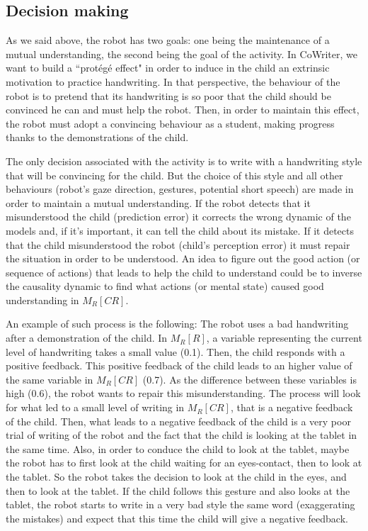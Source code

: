 \documentclass[10pt,a4paper]{article}
\begin{document}
\subsection{Decision making}
\label{ssec:decision}

As we said above, the robot has two goals: one being the maintenance of a mutual understanding, the second being the goal of the activity. 
In CoWriter, we want to build a ``prot\'eg\'e effect" in order to induce in the child an extrinsic motivation to practice handwriting. 
In that perspective, the behaviour of the robot is to pretend that its handwriting is so poor that the child should be convinced he can and must help the robot. Then, in order to maintain this effect, the robot must adopt a convincing behaviour as a student, making progress thanks to the demonstrations of the child. 

The only decision associated with the activity is to write with a handwriting style that will be convincing for the child. 
But the choice of this style and all other behaviours (robot's gaze direction, gestures, potential short speech) are made in order to maintain a mutual understanding. 
If the robot detects that it misunderstood the child (prediction error) it corrects the wrong dynamic of the models and, if it's important, it can tell the child about its mistake. 
If it detects that the child misunderstood the robot (child's perception error) it must repair the situation in order to be understood. 
An idea to figure out the good action (or sequence of actions) that leads to help the child to understand could be to inverse the causality dynamic to find what actions (or mental state) caused good understanding in $M_R\left[CR\right]$. 

An example of such process is the following: The robot uses a bad handwriting after a demonstration of the child. 
In $M_R\left[R\right]$, a variable representing the current level of handwriting takes a small value (0.1). Then, the child responds with a positive feedback. This positive feedback of the child leads to an higher value of the same variable in $M_R\left[CR\right]$ (0.7). As the difference between these variables is high (0.6), the robot wants to repair this misunderstanding. 
The process will look for what led to a small level of writing in $M_R\left[CR\right]$, that is a negative feedback of the child. Then, what leads to a negative feedback of the child is a very poor trial of writing of the robot and the fact that the child is looking at the tablet in the same time. Also, in order to conduce the child to look at the tablet, maybe the robot has to first look at the child waiting for an eyes-contact, then to look at the tablet. So the robot takes the decision to look at the child in the eyes, and then to look at the tablet. If the child follows this gesture and also looks at the tablet, the robot starts to write in a very bad style the same word (exaggerating the mistakes) and expect that this time the child will give a negative feedback.
\end{document}
